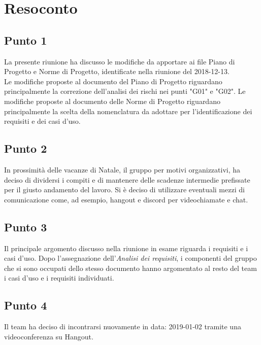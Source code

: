 \section{Resoconto}

\subsection{Punto 1}
La presente riunione ha discusso le modifiche da apportare ai file Piano di Progetto e Norme di Progetto, identificate nella riunione del 2018-12-13.\\
Le modifiche proposte al documento del Piano di Progetto riguardano principalmente la correzione dell'analisi dei rischi nei punti "G01" e "G02". 
Le modifiche proposte al documento delle Norme di Progetto riguardano principalmente la scelta della nomenclatura da adottare per l'identificazione dei requisiti e dei casi d'uso.

\subsection{Punto 2}
In prossimità delle vacanze di Natale, il gruppo per motivi organizzativi, ha deciso di dividersi i compiti e di mantenere delle scadenze intermedie prefissate per il giusto andamento del lavoro. Si è deciso di utilizzare eventuali mezzi di comunicazione come, ad esempio, hangout e discord per videochiamate e chat.

\subsection{Punto 3}
Il principale argomento discusso nella riunione in esame riguarda i requisiti e i casi d'uso. Dopo l'assegnazione dell'\textit{Analisi dei requisiti}, i componenti del gruppo che si sono occupati dello stesso documento hanno argomentato al resto del team i casi d'uso e i requisiti individuati.

\subsection{Punto 4}
Il team ha deciso di incontrarsi nuovamente in data: 2019-01-02 tramite una videoconferenza su Hangout.
